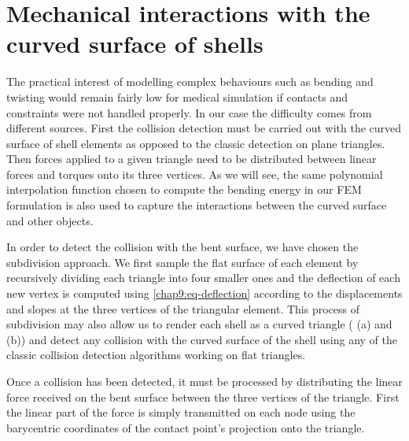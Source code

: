\section{Mechanical interactions with the curved surface of shells}	\label{chap9:interactions}

The practical interest of modelling complex behaviours such as bending and twisting would remain fairly low for medical simulation if contacts and constraints were not handled properly. In our case the difficulty comes from different sources. First the collision detection must be carried out with the curved surface of shell elements as opposed to the classic detection on plane triangles. Then forces applied to a given triangle need to be distributed between linear forces and torques onto its three vertices. As we will see, the same polynomial interpolation function chosen to compute the bending energy in our FEM formulation is also used to capture the interactions between the curved surface and other objects. 

In order to detect the collision with the bent surface, we have chosen the subdivision approach. We first sample the flat surface of each element by recursively dividing each triangle into four smaller ones and the deflection of each new vertex is computed using \eqref{chap9:eq-deflection} according to the displacements and slopes at the three vertices of the triangular element. This process of subdivision may also allow us to render each shell as a curved triangle ( (a) and (b)) and detect any collision with the curved surface of the shell using any of the classic collision detection algorithms working on flat triangles.

Once a collision has been detected, it must be processed by distributing the linear force received on the bent surface between the three vertices of the triangle. First the linear part of the force is simply transmitted on each node using the barycentric coordinates of the contact point's projection onto the triangle. 

